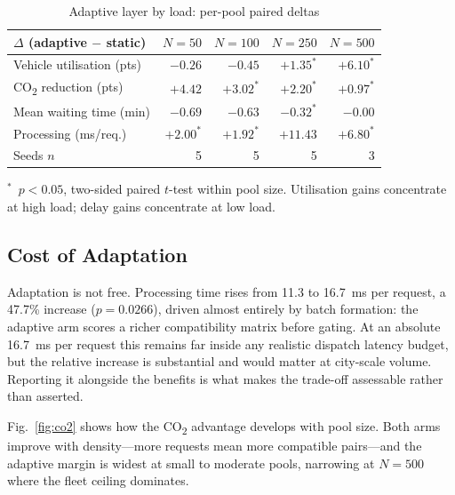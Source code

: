 \documentclass[conference]{IEEEtran}
\begin{document}
\begin{table}[t]
\caption{Adaptive layer by load: per-pool paired deltas}
\label{tab:byload}
\centering
\footnotesize
\setlength{\tabcolsep}{4.5pt}
\begin{tabular}{@{}lrrrr@{}}
\toprule
$\Delta$ (adaptive $-$ static) & $N{=}50$ & $N{=}100$ & $N{=}250$ & $N{=}500$ \\
\midrule
Vehicle utilisation (pts)  & $-0.26$ & $-0.45$ & $+1.35^{*}$ & $+6.10^{*}$ \\
CO\textsubscript{2} reduction (pts) & $+4.42$ & $+3.02^{*}$ & $+2.20^{*}$ & $+0.97^{*}$ \\
Mean waiting time (min)    & $-0.69$ & $-0.63$ & $-0.32^{*}$ & $-0.00$ \\
Processing (ms/req.)       & $+2.00^{*}$ & $+1.92^{*}$ & $+11.43$ & $+6.80^{*}$ \\
\midrule
Seeds $n$                  & 5 & 5 & 5 & 3 \\
\bottomrule
\end{tabular}
\vspace{2pt}
\begin{minipage}{\columnwidth}\raggedright\scriptsize
$^{*}$~$p<0.05$, two-sided paired $t$-test within pool size. Utilisation
gains concentrate at high load; delay gains concentrate at low load.
\end{minipage}
\end{table}

\subsection{Cost of Adaptation}
Adaptation is not free. Processing time rises from 11.3 to 16.7~ms per
request, a 47.7\% increase ($p=0.0266$), driven almost entirely by batch
formation: the adaptive arm scores a richer compatibility matrix before
gating. At an absolute 16.7~ms per request this remains far inside any
realistic dispatch latency budget, but the relative increase is substantial
and would matter at city-scale volume. Reporting it alongside the benefits is
what makes the trade-off assessable rather than asserted.

Fig.~\ref{fig:co2} shows how the CO\textsubscript{2} advantage develops with
pool size. Both arms improve with density---more requests mean more
compatible pairs---and the adaptive margin is widest at small to moderate
pools, narrowing at $N=500$ where the fleet ceiling dominates.
\end{document}
